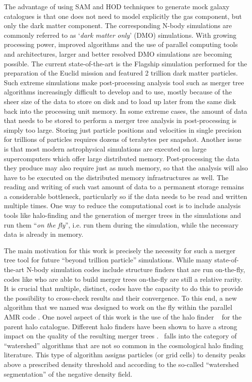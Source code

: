 The advantage of using SAM and HOD techniques to generate mock galaxy
catalogues is that one does not need to model explicitly the gas
component, but only the dark matter component.  The corresponding
N-body simulations are commonly referred to as `\emph{dark matter
only}' (DMO) simulations.  With growing processing power, improved
algorithms and the use of parallel computing tools and architectures,
larger and better resolved DMO simulations are becoming possible.  The
current state-of-the-art is the Flagship simulation performed for the
preparation of the Euclid mission \citep{potterPKDGRAV3} and featured 2
trillion dark matter particles.  Such extreme simulations make
post-processing analysis tool such as merger tree algorithms
increasingly difficult to develop and to use, mostly because of the
sheer size of the data to store on disk and to load up later from the
same disk back into the processing unit memory.  In some extreme
cases, the amount of data that needs to be stored to perform a merger
tree analysis in post-processing is simply too large.  Storing just
particle positions and velocities in single precision for trillions of
particles requires dozens of terabytes per snapshot.  Another issue is
that most modern astrophysical simulations are executed on large
supercomputers which offer large distributed memory.  Post-processing
the data they produce may also require just as much memory, so that
the analysis will also have to be executed on the distributed memory
infrastructures as well.  The reading and writing of such vast amount
of data to a permanent storage remains a considerable bottleneck,
particularly so if the data needs to be read and written multiple
times.  One way to reduce the computational cost is to include
analysis tools like halo-finding and the generation of merger trees in
the simulations and run them ``\textit{on the fly}'', i.e. run them
during the simulation, while the necessary data is already in memory.

The main motivation for this work is precisely the necessity for such
a merger tree tool for future ``beyond trillion particle''
simulations. While many state-of-the-art N-body simulation codes include
structure finders that are run on-the-fly, codes like 
\cite{springelSimulatingCosmicStructure2021} who are able to build
merger trees on-the-fly are still a relative rarity. It is crucial that
multiple, distinct, codes have the capacity to do this to provide the
possibility to cross-check results and their convergence.
To this end, a new algorithm that we named
\acacia was designed to work on the fly within the parallel
AMR code \ramses.  One novel aspect of this work is the use of the
halo finder \phew\ \citep{bleulerPHEWParallelSegmentation2015} for the parent halo catalogue.
Different halo finders have been shown to have a strong impact on the
quality of the resulting merger trees \citep{SUSSING_HALOFINDER}.
\phew\ falls into the category of ``watershed'' algorithms that are
not so common in the cosmological halo finding literature.  This type
of algorithm assigns particles (or grid cells) to density peaks above
a prescribed density threshold and according to the so-called
``watershed segmentation'' of the negative density field.

